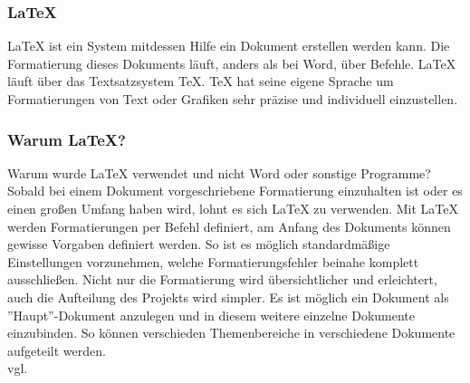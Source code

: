 \subsubsection {LaTeX}
\label{sec:LaTeX}
LaTeX ist ein System mitdessen Hilfe ein Dokument erstellen werden kann. Die Formatierung dieses Dokuments läuft, anders als bei Word, über Befehle. LaTeX läuft über das Textsatzsystem TeX. TeX hat seine eigene Sprache um Formatierungen von Text oder Grafiken sehr präzise und individuell einzustellen. 
\subsubsection{Warum LaTeX?} 
\label{sec:WarumLaTeX}
Warum wurde LaTeX verwendet und nicht Word oder sonstige Programme? Sobald bei einem Dokument vorgeschriebene Formatierung einzuhalten ist oder es einen großen Umfang haben wird, lohnt es sich LaTeX zu verwenden. Mit LaTeX werden Formatierungen per Befehl definiert, am Anfang des Dokuments können gewisse Vorgaben definiert werden. So ist es möglich standardmäßige Einstellungen vorzunehmen, welche Formatierungsfehler beinahe komplett ausschließen. Nicht nur die Formatierung wird übersichtlicher und erleichtert, auch die Aufteilung des Projekts wird simpler. Es ist möglich ein Dokument als ''Haupt''-Dokument anzulegen und in diesem weitere einzelne Dokumente einzubinden. So können verschieden Themenbereiche in verschiedene Dokumente aufgeteilt werden. \\vgl. \cite{TechnologieLaTeX} 